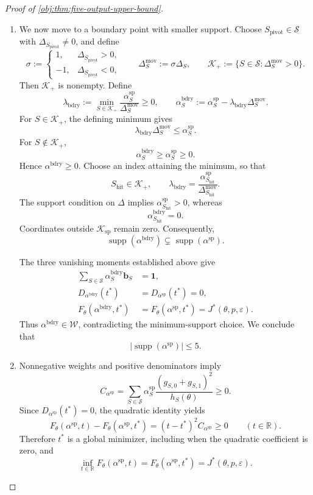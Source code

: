 \begin{proof}[Proof of \cref{obj:thm:five-output-upper-bound}]
\begin{enumerate}
\item
We now move to a boundary point with smaller support.
Choose \(S_{\mathrm{pivot}}\in\mathcal S\) with
\(\Delta_{S_{\mathrm{pivot}}}\ne0\), and define
\[
\sigma:=
\begin{cases}
1,&\Delta_{S_{\mathrm{pivot}}}>0,\\
-1,&\Delta_{S_{\mathrm{pivot}}}<0,
\end{cases}
\qquad
\Delta^{\mathrm{mov}}_S:=\sigma\Delta_S,
\qquad
\mathcal K_+:=\{S\in\mathcal S:\Delta^{\mathrm{mov}}_S>0\}.
\]
Then \(\mathcal K_+\) is nonempty. Define
\[
\lambda_{\mathrm{bdry}}
:=
\min_{S\in\mathcal K_+}
\frac{\alpha^{\mathrm{sp}}_S}{\Delta^{\mathrm{mov}}_S}
\ge0,
\qquad
\alpha^{\mathrm{bdry}}_S
:=
\alpha^{\mathrm{sp}}_S
-\lambda_{\mathrm{bdry}}\Delta^{\mathrm{mov}}_S.
\]
For \(S\in\mathcal K_+\), the defining minimum gives
\[
\lambda_{\mathrm{bdry}}\Delta^{\mathrm{mov}}_S
\le\alpha^{\mathrm{sp}}_S.
\]
For \(S\notin\mathcal K_+\),
\[
\alpha^{\mathrm{bdry}}_S
\ge\alpha^{\mathrm{sp}}_S\ge0.
\]
Hence \(\alpha^{\mathrm{bdry}}\ge0\).
Choose an index attaining the minimum, so that
\[
S_{\mathrm{hit}}\in\mathcal K_+,
\qquad
\lambda_{\mathrm{bdry}}
=
\frac{\alpha^{\mathrm{sp}}_{S_{\mathrm{hit}}}}
{\Delta^{\mathrm{mov}}_{S_{\mathrm{hit}}}}.
\]
The support condition on \(\Delta\) implies
\(\alpha^{\mathrm{sp}}_{S_{\mathrm{hit}}}>0\), whereas
\[
\alpha^{\mathrm{bdry}}_{S_{\mathrm{hit}}}=0.
\]
Coordinates outside \(\mathcal K_{\mathrm{sp}}\) remain zero.
Consequently,
\[
\operatorname{supp}(\alpha^{\mathrm{bdry}})
\subsetneq\operatorname{supp}(\alpha^{\mathrm{sp}}).
\]

The three vanishing moments established above give
\[
\begin{aligned}
\sum_{S\in\mathcal S}\alpha^{\mathrm{bdry}}_S\mathbf b_S
&=\mathbf1,\\
D_{\alpha^{\mathrm{bdry}}}(t^*)
&=D_{\alpha^{\mathrm{sp}}}(t^*)=0,\\
F_\theta(\alpha^{\mathrm{bdry}},t^*)
&=F_\theta(\alpha^{\mathrm{sp}},t^*)
=J^*(\theta,p,\varepsilon).
\end{aligned}
\]
Thus \(\alpha^{\mathrm{bdry}}\in\mathcal W\), contradicting the
minimum-support choice. We conclude that
\[
|\operatorname{supp}(\alpha^{\mathrm{sp}})|\le5.
\]

\item
Nonnegative weights and positive denominators imply
\[
C_{\alpha^{\mathrm{sp}}}
=
\sum_{S\in\mathcal S}
\alpha^{\mathrm{sp}}_S
\frac{(g_{S,0}+g_{S,1})^2}{h_S(\theta)}
\ge0.
\]
Since \(D_{\alpha^{\mathrm{sp}}}(t^*)=0\), the quadratic identity yields
\[
F_\theta(\alpha^{\mathrm{sp}},t)
-F_\theta(\alpha^{\mathrm{sp}},t^*)
=
(t-t^*)^2C_{\alpha^{\mathrm{sp}}}\ge0
\qquad(t\in\mathbb R).
\]
Therefore \(t^*\) is a global minimizer, including when the quadratic
coefficient is zero, and
\[
\inf_{t\in\mathbb R}F_\theta(\alpha^{\mathrm{sp}},t)
=
F_\theta(\alpha^{\mathrm{sp}},t^*)
=
J^*(\theta,p,\varepsilon).
\]


\end{enumerate}
\end{proof}
